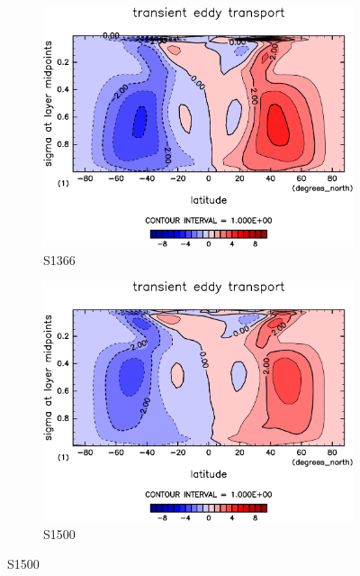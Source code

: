 \documentclass[body]{subfiles}
\begin{document}
\begin{figure}[t]
	\centering
	\begin{subfigure}{.4\textwidth}
		\centering
		\includegraphics[width=\columnwidth]{S1366/MeriHeatTransTest@dryStatEn_TE,time=14600:14965-crop-rotate.pdf}
		\caption{S1366}\label{乾燥静的エネルギー移動性擾乱S1366}
	\end{subfigure}
	\begin{subfigure}{.4\textwidth}
		\centering
		\includegraphics[width=\columnwidth]{S1500/MeriHeatTransTest@dryStatEn_TE,time=3650:4015-crop-rotate.pdf}
		\caption{S1500}\label{乾燥静的エネルギー移動性擾乱S1500}
	\end{subfigure}

\end{figure}
\end{document}
